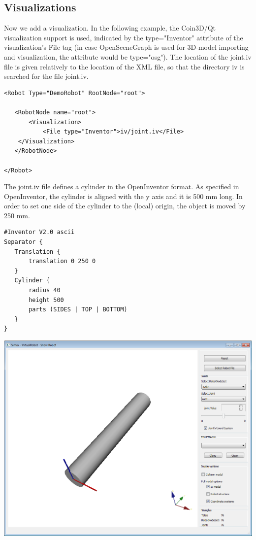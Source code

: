 \subsection{Visualizations}
\par
Now we add a visualization. In the following example, the Coin3D/Qt visualization support is used, indicated by the type="Inventor" attribute of the visualization's File tag (in case OpenSceneGraph is used for 3D-model importing and visualization, the attribute would be type="osg"). The location of the joint.iv file is given relatively to the location of the XML file, so that the directory iv is searched for the file joint.iv. 
\begin{lstlisting}
<Robot Type="DemoRobot" RootNode="root">

   <RobotNode name="root">
       <Visualization>
           <File type="Inventor">iv/joint.iv</File>
    </Visualization>
   </RobotNode>

</Robot>
\end{lstlisting}
\par
The joint.iv file defines a cylinder in the OpenInventor format. As specified in OpenInventor, the cylinder is aligned with the y axis and it is 500 mm long. In order to set one side of the cylinder to the (local) origin, the object is moved by 250 mm. 
\par
\begin{lstlisting}
#Inventor V2.0 ascii
Separator {
   Translation {
       translation 0 250 0
   }
   Cylinder {
       radius 40
       height 500
       parts (SIDES | TOP | BOTTOM)
   }
}
\end{lstlisting}
\includegraphics[width=\textwidth]{Tutorial2}
\par
